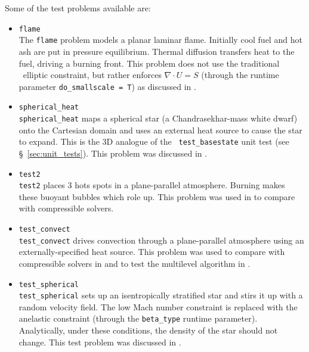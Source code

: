 Some of the test problems available are:
\begin{itemize}
\item {\tt flame} \\[-3mm]

The {\tt flame} problem models a planar laminar flame.  Initially cool
fuel and hot ash are put in pressure equilibrium.  Thermal diffusion
transfers heat to the fuel, driving a burning front.  This problem
does not use the traditional \maestro\ elliptic constraint, but
rather enforces $\nabla \cdot U = S$ (through the runtime parameter
{\tt do\_smallscale = T}) as discussed in \cite{SNe}.

\item {\tt spherical\_heat} \\[-3mm]

{\tt spherical\_heat} maps a spherical star (a Chandrasekhar-mass white
dwarf) onto the Cartesian domain and uses an external heat source to
cause the star to expand.  This is the 3D analogue of the {\tt
  test\_basestate} unit test (see \S~\ref{sec:unit_tests}).  This
problem was discussed in \cite{multilevel}.

\item {\tt test2} \\[-3mm]

{\tt test2} places 3 hots spots in a plane-parallel atmosphere.
Burning makes these buoyant bubbles which role up.  This problem was
used in \cite{lowMach3} to compare with compressible solvers.

\item {\tt test\_convect} \\[-3mm]

{\tt test\_convect} drives convection through a plane-parallel
atmosphere using an externally-specified heat source.  This problem
was used to compare with compressible solvers in \cite{lowMach3}
and to test the multilevel algorithm in \cite{multilevel}.

\item {\tt test\_spherical} \\[-3mm]

{\tt test\_spherical} sets up an isentropically stratified star
and stirs it up with a random velocity field.  The low Mach number
constraint is replaced with the anelastic constraint (through
the {\tt beta\_type} runtime parameter).  Analytically, under
these conditions, the density of the star should not change.
This test problem was discussed in \cite{lowMach4}.

\end{itemize}




